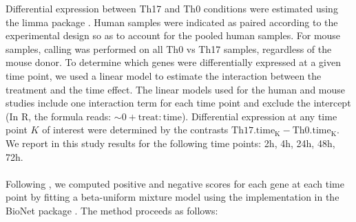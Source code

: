 Differential expression between Th17 and Th0 conditions were estimated using the limma package \parencite{smyth2005limma}.
Human samples were indicated as paired according to the experimental design so as to account for the pooled human samples.
For mouse samples, calling was performed on all Th0 vs Th17 samples, regardless of the mouse donor.
To determine which genes were differentially expressed at a given time point, we used a linear model to estimate the interaction between the treatment and the time effect.
The linear models used for the human and mouse studies include one interaction term for each time point and exclude the intercept (In R, the formula reads: $\mathrm{\sim 0+treat:time}$).
Differential expression at any time point $K$ of interest were determined by the contrasts $\mathrm{Th17.time_{K} - Th0.time_{K}}$.
We report in this study results for the following time points: \unit{2}{h}, \unit{4}{h}, \unit{24}{h}, \unit{48}{h}, \unit{72}{h}.



\noindent\paragraph{}\noindent Following \parencite{dittrich2008identifying}, we computed positive and negative scores for each gene at each time point by fitting a beta-uniform mixture model using the implementation in the BioNet package \parencite{beisser2010bionet}.
The method proceeds as follows:

